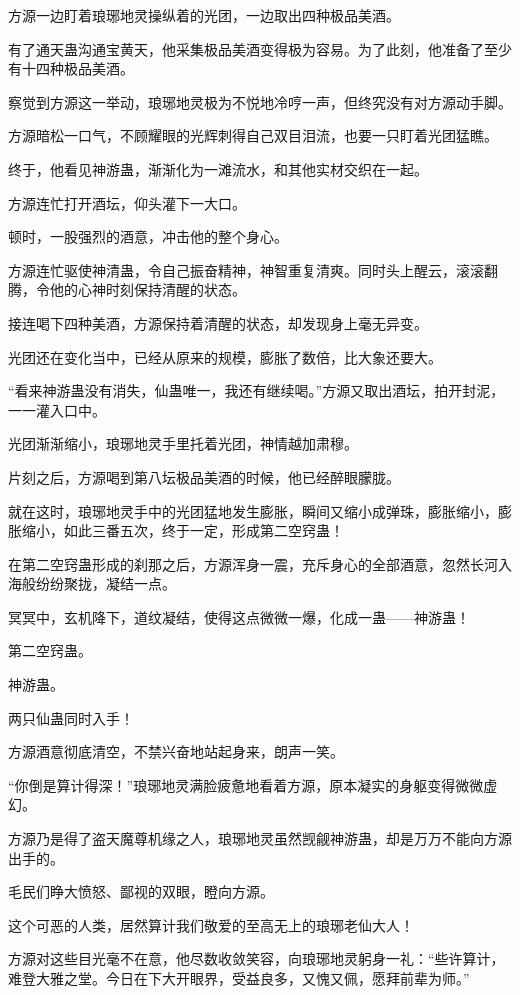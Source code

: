 \begin{this_body}
方源一边盯着琅琊地灵操纵着的光团，一边取出四种极品美酒。

有了通天蛊沟通宝黄天，他采集极品美酒变得极为容易。为了此刻，他准备了至少有十四种极品美酒。

察觉到方源这一举动，琅琊地灵极为不悦地冷哼一声，但终究没有对方源动手脚。

方源暗松一口气，不顾耀眼的光辉刺得自己双目泪流，也要一只盯着光团猛瞧。

终于，他看见神游蛊，渐渐化为一滩流水，和其他实材交织在一起。

方源连忙打开酒坛，仰头灌下一大口。

顿时，一股强烈的酒意，冲击他的整个身心。

方源连忙驱使神清蛊，令自己振奋精神，神智重复清爽。同时头上醒云，滚滚翻腾，令他的心神时刻保持清醒的状态。

接连喝下四种美酒，方源保持着清醒的状态，却发现身上毫无异变。

光团还在变化当中，已经从原来的规模，膨胀了数倍，比大象还要大。

“看来神游蛊没有消失，仙蛊唯一，我还有继续喝。”方源又取出酒坛，拍开封泥，一一灌入口中。

光团渐渐缩小，琅琊地灵手里托着光团，神情越加肃穆。

片刻之后，方源喝到第八坛极品美酒的时候，他已经醉眼朦胧。

就在这时，琅琊地灵手中的光团猛地发生膨胀，瞬间又缩小成弹珠，膨胀缩小，膨胀缩小，如此三番五次，终于一定，形成第二空窍蛊！

在第二空窍蛊形成的刹那之后，方源浑身一震，充斥身心的全部酒意，忽然长河入海般纷纷聚拢，凝结一点。

冥冥中，玄机降下，道纹凝结，使得这点微微一爆，化成一蛊——神游蛊！

第二空窍蛊。

神游蛊。

两只仙蛊同时入手！

方源酒意彻底清空，不禁兴奋地站起身来，朗声一笑。

“你倒是算计得深！”琅琊地灵满脸疲惫地看着方源，原本凝实的身躯变得微微虚幻。

方源乃是得了盗天魔尊机缘之人，琅琊地灵虽然觊觎神游蛊，却是万万不能向方源出手的。

毛民们睁大愤怒、鄙视的双眼，瞪向方源。

这个可恶的人类，居然算计我们敬爱的至高无上的琅琊老仙大人！

方源对这些目光毫不在意，他尽数收敛笑容，向琅琊地灵躬身一礼：“些许算计，难登大雅之堂。今日在下大开眼界，受益良多，又愧又佩，愿拜前辈为师。”

\end{this_body}


